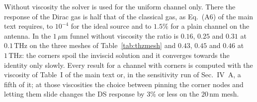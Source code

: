 \documentclass[aps,prapplied,onecolumn,superscriptaddress,floatfix]{revtex4-2}
\newcommand{\um}{\,\mu\mathrm{m}}
\newcommand{\nm}{\,\mathrm{nm}}
\newcommand{\THz}{\,\mathrm{THz}}
\begin{document}
Without viscosity the solver is used for the uniform channel only. There
the response of the Dirac gas is half that of the classical gas, as
Eq.~(A6) of the main text requires, to $10^{-4}$ for the ideal source
and to $1.5\%$ for a plain channel on the antenna. In the $1\um$ funnel
without viscosity the ratio is $0.16$, $0.25$ and $0.31$ at $0.1\THz$ on
the three meshes of Table~\ref{tab:thzmesh} and $0.43$, $0.45$ and $0.46$
at $1\THz$: the corners spoil the inviscid solution and it converges
towards the identity only slowly. Every result for a channel with corners
is computed with the viscosity of Table~I of the main text or, in the
sensitivity run of Sec.~IV~A, a fifth of it; at those viscosities the
choice between pinning the corner nodes and letting them slide changes
the DS response by $3\%$ or less on the $20\nm$ mesh.
\end{document}
